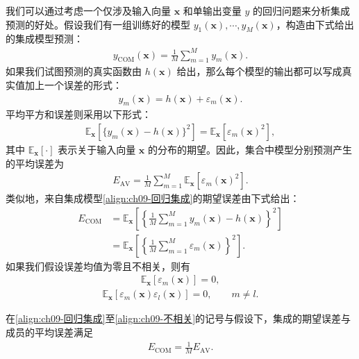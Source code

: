 \documentclass[../../main.tex]{subfiles}
\begin{document}
我们可以通过考虑一个仅涉及输入向量 $\boldsymbol{x}$ 和单输出变量 $y$ 的回归问题来分析集成预测的好处。假设我们有一组训练好的模型 $y_{1}(\boldsymbol{x}),\cdots,y_{M}(\boldsymbol{x})$，构造由下式给出的集成模型预测：
\begin{align}
y_{\mathrm{COM}}(\boldsymbol{x})=\frac{1}{M}\sum_{m=1}^{M}y_{m}(\boldsymbol{x}).
\label{align:ch09-回归集成}
\end{align}
如果我们试图预测的真实函数由 $h(\boldsymbol{x})$ 给出，那么每个模型的输出都可以写成真实值加上一个误差的形式：
\begin{align}
y_{m}(\boldsymbol{x})=h(\boldsymbol{x})+\varepsilon_{m}(\boldsymbol{x}).
\label{align:ch09-模型误差}
\end{align}
平均平方和误差则采用以下形式：
\begin{align}
\mathbb{E}_{\boldsymbol{x}}\!\left[\{y_{m}(\boldsymbol{x})-h(\boldsymbol{x})\}^{2}\right]=\mathbb{E}_{\boldsymbol{x}}[\varepsilon_{m}(\boldsymbol{x})^{2}],
\label{align:ch09-平方误差}
\end{align}
其中 $\mathbb{E}_{\boldsymbol{x}}[\cdot]$ 表示关于输入向量 $\boldsymbol{x}$ 的分布的期望。因此，集合中模型分别预测产生的平均误差为
\begin{align}
E_{\mathrm{AV}}=\frac{1}{M}\sum_{m=1}^{M}\mathbb{E}_{\boldsymbol{x}}[\varepsilon_{m}(\boldsymbol{x})^{2}].
\label{align:ch09-平均误差}
\end{align}
类似地，来自集成模型\eqref{align:ch09-回归集成}的期望误差由下式给出：
\begin{align}
E_{\mathrm{COM}}&=\mathbb{E}_{\boldsymbol{x}}\!\left[\left\{\frac{1}{M}\sum_{m=1}^{M}y_{m}(\boldsymbol{x})-h(\boldsymbol{x})\right\}^{2}\right]\nonumber\\
&=\mathbb{E}_{\boldsymbol{x}}\!\left[\left\{\frac{1}{M}\sum_{m=1}^{M}\varepsilon_{m}(\boldsymbol{x})\right\}^{2}\right].
\label{align:ch09-集成误差}
\end{align}
如果我们假设误差均值为零且不相关，则有
\begin{align}
\mathbb{E}_{\boldsymbol{x}}[\varepsilon_{m}(\boldsymbol{x})]=0,
\label{align:ch09-零均值}
\end{align}
\begin{align}
\mathbb{E}_{\boldsymbol{x}}[\varepsilon_{m}(\boldsymbol{x})\varepsilon_{l}(\boldsymbol{x})]=0,\qquad m\neq l.
\label{align:ch09-不相关}
\end{align}

\begin{theorem}[集成误差的分解]\label{theorem:ch09-集成误差}
在\eqref{align:ch09-回归集成}至\eqref{align:ch09-不相关}的记号与假设下，集成的期望误差与成员的平均误差满足
\begin{align}
E_{\mathrm{COM}}=\frac{1}{M}E_{\mathrm{AV}}.
\label{align:ch09-集成误差结果}
\end{align}
\end{theorem}
\end{document}
